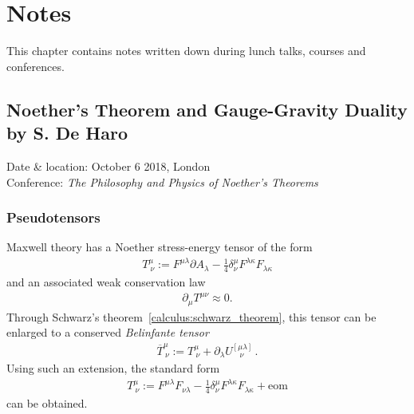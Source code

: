 \chapter{Notes}

    This chapter contains notes written down during lunch talks, courses and conferences.

\section{Noether's Theorem and Gauge-Gravity Duality by S. De Haro}

    Date \& location: October 6 2018, London\\
    Conference: \textit{The Philosophy and Physics of Noether's Theorems}

\subsection{Pseudotensors}

    Maxwell theory has a Noether stress-energy tensor of the form
    \begin{gather}
        T^\mu_{\ \nu} := F^{\mu\lambda}\partial A_\lambda - \frac{1}{4}\delta^\mu_\nu F^{\lambda\kappa}F_{\lambda\kappa}
    \end{gather}
    and an associated weak conservation law
    \begin{gather}
        \partial_\mu T^{\mu\nu}\approx 0.
    \end{gather}
    Through Schwarz's theorem~\ref{calculus:schwarz_theorem}, this tensor can be enlarged to a conserved \textit{Belinfante tensor}
    \begin{gather}
        \overline{T}^\mu_{\ \nu} := T^\mu_{\ \nu} + \partial_\lambda U^{[\mu\lambda]}_{\ \ \ \ \nu}\,.
    \end{gather}
    Using such an extension, the standard form
    \begin{gather}
        T^\mu_{\ \nu} := F^{\mu\lambda}F_{\nu\lambda} - \frac{1}{4}\delta^\mu_\nu F^{\lambda\kappa}F_{\lambda\kappa} + \text{eom}
    \end{gather}
    can be obtained.

